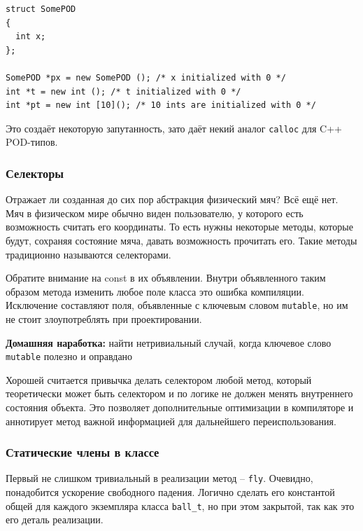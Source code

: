 \documentclass[a4paper,12pt,oneside]{article}
\begin{document}
\begin{lstlisting}
struct SomePOD
{
  int x;
};

SomePOD *px = new SomePOD (); /* x initialized with 0 */
int *t = new int (); /* t initialized with 0 */
int *pt = new int [10](); /* 10 ints are initialized with 0 */
\end{lstlisting}

Это создаёт некоторую запутанность, зато даёт некий аналог \lstinline!calloc! для C++ POD-типов. 

\subsubsection{Селекторы}\label{Selectors}

Отражает ли созданная до сих пор абстракция физический мяч? Всё ещё нет. Мяч в физическом мире обычно виден пользователю, у которого есть возможность считать его координаты. То есть нужны некоторые методы, которые будут, сохраняя состояние мяча, давать возможность прочитать его. Такие методы традиционно называются селекторами.



Обратите внимание на const в их объявлении. Внутри объявленного таким образом метода изменить любое поле класса это ошибка компиляции. Исключение составляют поля, объявленные с ключевым словом \lstinline!mutable!, но им не стоит злоупотреблять при проектировании.

\textbf{Домашняя наработка:} найти нетривиальный случай, когда ключевое слово \lstinline!mutable! полезно и оправдано

Хорошей считается привычка делать селектором любой метод, который теоретически может быть селектором и по логике не должен менять внутреннего состояния объекта. Это позволяет дополнительные оптимизации в компиляторе и аннотирует  метод важной информацией для дальнейшего переиспользования.

\subsubsection{Статические члены в классе}\label{StaticMembers}

Первый не слишком тривиальный в реализации метод -- \lstinline!fly!. Очевидно, понадобится ускорение свободного падения. Логично сделать его константой общей для каждого экземпляра класса \lstinline!ball_t!, но при этом закрытой, так как это его деталь реализации.
\end{document}
